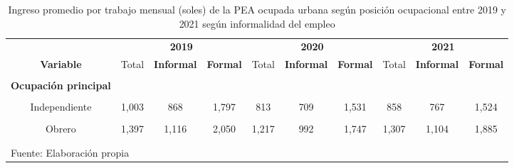\documentclass[
  letterpaper,
  12pt,
  oneside,
  spanish,
  doublespacing,
  headsepline,
  parskip]{MastersDoctoralThesis}
\begin{document}
\hypertarget{tbl-ing_p507}{}
\begin{table}[H]
\caption{\label{tbl-ing_p507}Ingreso promedio por trabajo mensual (soles) de la PEA ocupada urbana
según posición ocupacional entre 2019 y 2021 según informalidad del
empleo }\tabularnewline

\centering\begingroup\fontsize{9}{11}\selectfont

\begin{tabular}{cccccccccc}
\toprule
\multicolumn{1}{c}{ } & \multicolumn{3}{c}{\textbf{2019}} & \multicolumn{3}{c}{\textbf{2020}} & \multicolumn{3}{c}{\textbf{2021}} \\
\cmidrule(l{3pt}r{3pt}){2-4} \cmidrule(l{3pt}r{3pt}){5-7} \cmidrule(l{3pt}r{3pt}){8-10}
\textbf{Variable} & Total & \textbf{Informal} & \textbf{Formal} & Total & \textbf{Informal} & \textbf{Formal} & Total & \textbf{Informal} & \textbf{Formal}\\
\midrule
\cellcolor{gray!6}{\textbf{Nacional}} & \cellcolor{gray!6}{1,595} & \cellcolor{gray!6}{1,037} & \cellcolor{gray!6}{2,599} & \cellcolor{gray!6}{1,407} & \cellcolor{gray!6}{901} & \cellcolor{gray!6}{2,380} & \cellcolor{gray!6}{1,443} & \cellcolor{gray!6}{989} & \cellcolor{gray!6}{2,473}\\
\textbf{Ocupación principal} &  &  &  &  &  &  &  &  & \\
\cellcolor{gray!6}{Empleador} & \cellcolor{gray!6}{2,801} & \cellcolor{gray!6}{1,926} & \cellcolor{gray!6}{3,538} & \cellcolor{gray!6}{2,533} & \cellcolor{gray!6}{1,802} & \cellcolor{gray!6}{3,187} & \cellcolor{gray!6}{2,662} & \cellcolor{gray!6}{1,960} & \cellcolor{gray!6}{3,386}\\
Independiente & 1,003 & 868 & 1,797 & 813 & 709 & 1,531 & 858 & 767 & 1,524\\
\cellcolor{gray!6}{Empleado} & \cellcolor{gray!6}{2,288} & \cellcolor{gray!6}{1,229} & \cellcolor{gray!6}{2,900} & \cellcolor{gray!6}{2,260} & \cellcolor{gray!6}{1,240} & \cellcolor{gray!6}{2,784} & \cellcolor{gray!6}{2,252} & \cellcolor{gray!6}{1,288} & \cellcolor{gray!6}{2,886}\\
\addlinespace
Obrero & 1,397 & 1,116 & 2,050 & 1,217 & 992 & 1,747 & 1,307 & 1,104 & 1,885\\
\cellcolor{gray!6}{Trabajador del Hogar} & \cellcolor{gray!6}{1,063} & \cellcolor{gray!6}{982} & \cellcolor{gray!6}{1,657} & \cellcolor{gray!6}{985} & \cellcolor{gray!6}{908} & \cellcolor{gray!6}{1,476} & \cellcolor{gray!6}{1,057} & \cellcolor{gray!6}{1,006} & \cellcolor{gray!6}{1,633}\\
\bottomrule
\multicolumn{10}{l}{\textsuperscript{} Fuente: Elaboración propia}\\
\end{tabular}
\endgroup{}
\end{table}
\end{document}
